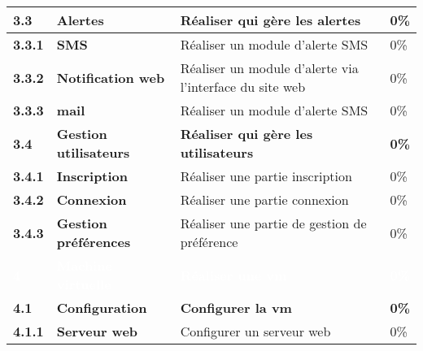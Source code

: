 \begin{supertabular}{|p{1.5cm} p{6cm}|p{5cm}|R{2cm}|}
  \textbf{3.3}  & \textbf{Alertes} & \textbf{Réaliser qui gère les alertes} & \textbf{0\%} \\
  \hline

  \hspace{6pt}
  \textbf{3.3.1}  & \textbf{SMS} & Réaliser un module d'alerte SMS  & 0\% \\
  \hline

  \hspace{6pt}
  \textbf{3.3.2}  & \textbf{Notification web} & Réaliser un module d'alerte via l'interface du site web & 0\% \\
  \hline

  \hspace{6pt}
  \textbf{3.3.3}  & \textbf{mail} & Réaliser un module d'alerte SMS & 0\% \\
  \hline


  \textbf{3.4}  & \textbf{Gestion utilisateurs} & \textbf{Réaliser qui gère les utilisateurs} & \textbf{0\%} \\
  \hline

  \hspace{6pt}
  \textbf{3.4.1}  & \textbf{Inscription} & Réaliser une partie inscription & 0\% \\
  \hline

  \hspace{6pt}
  \textbf{3.4.2}  & \textbf{Connexion} & Réaliser une partie connexion & 0\% \\
  \hline

  \hspace{6pt}
  \textbf{3.4.3}  & \textbf{Gestion préférences} & Réaliser une partie de gestion de préférence & 0\% \\
  \hline





  \textcolor{white}{\textbf{4}}  & \textcolor{white}{\textbf{Machine virtuelle}} & \textcolor{white}{\textbf{Réaliser une vm}} & \textcolor{white}{\textbf{0\%}} \\
  \hline

  \textbf{4.1}  & \textbf{Configuration} & \textbf{Configurer la vm} & \textbf{0\%} \\
  \hline

  \hspace{6pt}
  \textbf{4.1.1}  & \textbf{Serveur web} & Configurer un serveur web & 0\% \\
  \hline


\end{supertabular}
